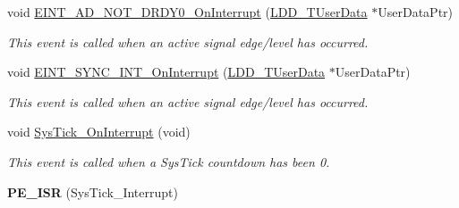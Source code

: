 \begin{DoxyCompactItemize}
void \hyperlink{group___events__module_ga657b9d2b194dae2bf4287eb4d8c8e512}{E\-I\-N\-T\-\_\-\-A\-D\-\_\-\-N\-O\-T\-\_\-\-D\-R\-D\-Y0\-\_\-\-On\-Interrupt} (\hyperlink{group___p_e___types__module_ga0b66a73f87238a782318aa0be7578e35}{L\-D\-D\-\_\-\-T\-User\-Data} $\ast$User\-Data\-Ptr)
\begin{DoxyCompactList}\small\item\em This event is called when an active signal edge/level has occurred. \end{DoxyCompactList}\item 
void \hyperlink{group___events__module_ga52662597d7ac93aa02b83239e5a6b645}{E\-I\-N\-T\-\_\-\-S\-Y\-N\-C\-\_\-\-I\-N\-T\-\_\-\-On\-Interrupt} (\hyperlink{group___p_e___types__module_ga0b66a73f87238a782318aa0be7578e35}{L\-D\-D\-\_\-\-T\-User\-Data} $\ast$User\-Data\-Ptr)
\begin{DoxyCompactList}\small\item\em This event is called when an active signal edge/level has occurred. \end{DoxyCompactList}\item 
\hypertarget{group___events__module_ga62cacd25ae2e957c1d8f473f3ee4bac9}{void \hyperlink{group___events__module_ga62cacd25ae2e957c1d8f473f3ee4bac9}{Sys\-Tick\-\_\-\-On\-Interrupt} (void)}\label{group___events__module_ga62cacd25ae2e957c1d8f473f3ee4bac9}

\begin{DoxyCompactList}\small\item\em This event is called when a Sys\-Tick countdown has been 0. \end{DoxyCompactList}\item 
\hypertarget{group___events__module_ga15d641eb67ba475a486d9e9199682c3a}{{\bfseries P\-E\-\_\-\-I\-S\-R} (Sys\-Tick\-\_\-\-Interrupt)}\label{group___events__module_ga15d641eb67ba475a486d9e9199682c3a}


\end{DoxyCompactItemize}
